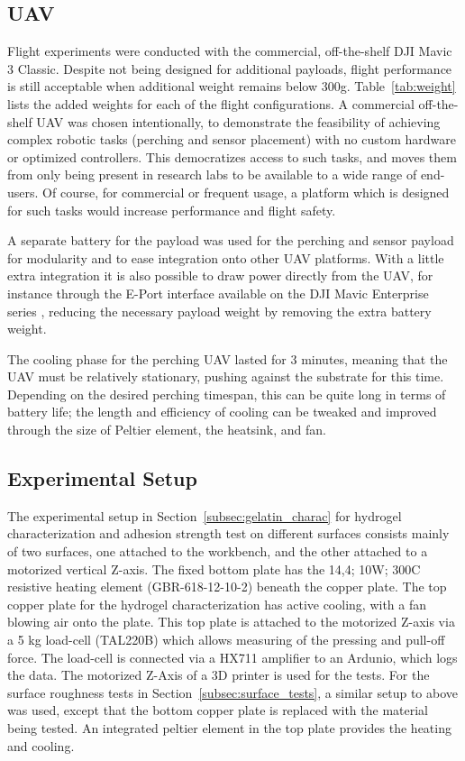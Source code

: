 \subsection{UAV}
Flight experiments were conducted with the commercial, off-the-shelf DJI Mavic 3 Classic. Despite not being designed for additional payloads, flight performance is still acceptable when additional weight remains below 300g. Table~\ref{tab:weight} lists the added weights for each of the flight configurations. A commercial off-the-shelf UAV was chosen intentionally, to demonstrate the feasibility of achieving complex robotic tasks (perching and sensor placement) with no custom hardware or optimized controllers. This democratizes access to such tasks, and moves them from only being present in research labs to be available to a wide range of end-users.
Of course, for commercial or frequent usage, a platform which is designed for such tasks would increase performance and flight safety.

A separate battery for the payload was used for the perching and sensor payload for modularity and to ease integration onto other UAV platforms. With a little extra integration it is also possible to draw power directly from the UAV, for instance through the E-Port interface available on the DJI Mavic Enterprise series \cite{DJI}, reducing the necessary payload weight by removing the extra battery weight. 

The cooling phase for the perching UAV lasted for 3 minutes, meaning that the UAV must be relatively stationary, pushing against the substrate for this time. Depending on the desired perching timespan, this can be quite long in terms of battery life; the length and efficiency of cooling can be tweaked and improved through the size of Peltier element, the heatsink, and fan. 

\subsection{Experimental Setup}
The experimental setup in Section~\ref{subsec:gelatin_charac} for hydrogel characterization and adhesion strength test on different surfaces consists mainly of two surfaces, one attached to the workbench, and the other attached to  a motorized vertical Z-axis. The fixed bottom plate has the 14,4\ohm; 10W; 300\degree C resistive heating element (GBR-618-12-10-2) beneath the copper plate. The top copper plate for the hydrogel characterization has active cooling, with a fan blowing air onto the plate. This top plate is attached to the motorized Z-axis via a 5 kg load-cell (TAL220B) which allows measuring of the pressing and pull-off force. The load-cell is connected via a HX711 amplifier to an Ardunio, which logs the data. The motorized Z-Axis of a 3D printer is used for the tests.
For the surface roughness tests in Section~\ref{subsec:surface_tests}, a similar setup to above was used, except that the bottom copper plate is replaced with the material being tested. An integrated peltier element in the top plate provides the heating and cooling.


